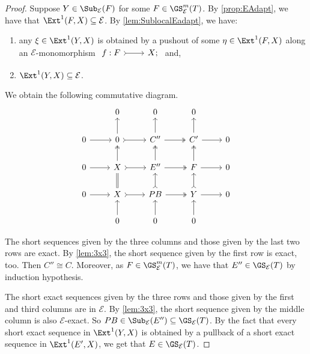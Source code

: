 \begin{proof}
Suppose $Y \in \Sub_\mathcal{E}(F)$ for some $F \in \GS^{m}_{\mathcal{E}}(T)$. By \cref{prop:EAdapt}, we have that $\Ext^1(F,X) \subseteq \mathcal{E}$. By \cref{lem:SublocalEadapt}, we have:
\begin{enumerate}[label=$\bullet$, itemsep=1mm]
    \item any $\xi \in \Ext^1(Y,X)$ is obtained by a pushout of some $\eta \in \Ext^1(F,X)$ along an $\mathcal{E}$-monomorphism $\begin{tikzcd}
	 f: F & X;
	\arrow[tail,from=1-1, to=1-2]
   \end{tikzcd}$ and,
    \item $\Ext^1(Y,X) \subseteq \mathcal{E}$.
\end{enumerate}
We obtain the following commutative diagram.
\[\begin{tikzcd}
         & 0 & 0 & 0 &  \\
	0 & 0 & C''  & C' &  0 \\
     0 & X & E'' & F & 0 \\
      0 & X & PB & Y & 0 \\
       & 0 & 0 & 0 & 
	\arrow[from=2-1, to=2-2]
	\arrow[tail, from=2-2, to=2-3]
	\arrow[two heads,from=2-3, to=2-4]
	\arrow[from=2-4, to=2-5]
        \arrow[from=3-1, to=3-2]
	\arrow[tail, from=3-2, to=3-3]
	\arrow[two heads,from=3-3, to=3-4]
	\arrow[from=3-4, to=3-5]
        \arrow[from=4-1, to=4-2]
	\arrow[tail, from=4-2, to=4-3]
	\arrow[two heads,from=4-3, to=4-4]
	\arrow[from=4-4, to=4-5]
        \arrow[from=5-2, to=4-2]
	\arrow[equals, from=4-2, to=3-2]
	\arrow[two heads,from=3-2, to=2-2]
	\arrow[from=2-2, to=1-2]
        \arrow[from=5-3, to=4-3]
	\arrow[tail, from=4-3, to=3-3]
	\arrow[two heads,from=3-3, to=2-3]
	\arrow[from=2-3, to=1-3]
        \arrow[from=5-4, to=4-4]
	\arrow[tail, from=4-4, to=3-4]
	\arrow[two heads,from=3-4, to=2-4]
	\arrow[from=2-4, to=1-4]
\end{tikzcd} \]

The short sequences given by the three columns and those given by the last two rows are exact. By \cref{lem:3x3}, the short sequence given by the first row is exact, too. Then $C'' \cong C$. Moreover, as $F \in \GS^{m}_{\mathcal{E}}(T)$, we have that $E'' \in \GS_{\mathcal{E}}(T)$ by induction hypothesis.

The short exact sequences given by the three rows and those given by the first and third columns are in ${\mathcal{E}}$. By \cref{lem:3x3}, the short sequence given by the middle column is also $\mathcal{E}$-exact. So $PB \in \Sub_\mathcal{E}(E'') \subseteq \GS_{\mathcal{E}}(T)$. By the fact that every short exact sequence in $\Ext^1(Y,X)$ is obtained by a pullback of a short exact sequence in $\Ext^1(E',X)$, we get that $E \in \GS_{\mathcal{E}}(T)$.


\end{proof}
